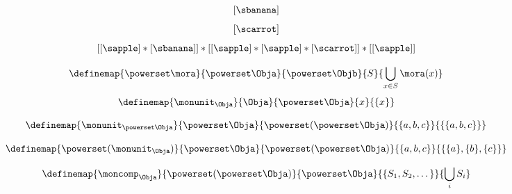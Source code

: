 {\begin{forslides}
\begin{equation}
            [ \sapple ]
        \end{equation}
        \begin{equation}
            \label{eq:fruit-sum-17}
            [ \sbanana ]
        \end{equation}
        \begin{equation}
            \label{eq:fruit-sum-18}
            [ \scarrot ]
        \end{equation}
        \begin{equation}
            \label{eq:fruit-sum-20}
            [ [ \sapple ]   * [ \sbanana] ] *  [[ \sapple ]   *  [ \sapple ] *  [\scarrot ] ]   *  [[ \sapple ] ]
        \end{equation}
    \end{forslides}

}

\begin{equation}
    \label{eq:monad-power-functor}
    \definemap{
        \powerset \mora
    }{
        \powerset \Obja
    }{
        \powerset \Objb
    }{
        S
    }{
        \bigcup_{x\in S} \mora(x)
    }
\end{equation}
%
\begin{equation}
    \label{eq:monad-power-monunit}
    \definemap{
        \monunit_\Obja
    }{
        \Obja
    }{
        \powerset\Obja
    }{
        x
    }{
        \{ x \}
    }
\end{equation}

\begin{equation}
    \label{eq:monad-power-monunit-power}
    \definemap{
        \monunit_{\powerset \Obja}
    }{
        \powerset \Obja
    }{
        \powerset (\powerset\Obja)
    }{
        \{a, b, c\}
    }{
        \{ \{a, b, c \} \}
    }
\end{equation}

\begin{equation}
    \label{eq:monad-power-power-monunit}
    \definemap{
        \powerset(\monunit_\Obja)
    }{
        \powerset \Obja
    }{
        \powerset (\powerset\Obja)
    }{
        \{a, b, c\}
    }{
        \{ \{a\}, \{ b\}, \{c\} \}
    }
\end{equation}

\begin{equation}
    \label{eq:monad-power-moncomp}
    \definemap{
        \moncomp_{\Obja}
    }{
        \powerset (\powerset\Obja)
    }{
        \powerset \Obja
    }{
        \{S_1, S_2, \dots \}
    }{
        \bigcup_i S_i
    }
\end{equation}

